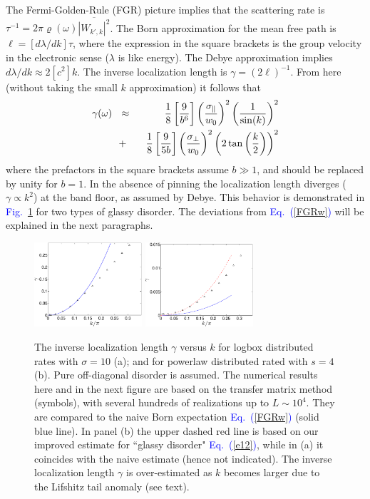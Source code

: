 \documentclass[onecolumn,fleqn,notitlepage,secnumarabic]{revtex4}
\newcommand{\Eq}[1]{\textcolor{blue}{Eq.\!\!~(\ref{#1})}}
\newcommand{\Fig}[1]{\textcolor{blue}{Fig.}\!\!~\ref{#1}}
\newcommand{\be}[1]{\begin{eqnarray}\ifthenelse{#1=-1}{\nonumber}{\ifthenelse{#1=0}{}{\label{e#1}}}}
\newcommand{\ee}{\end{eqnarray}}
\newcommand{\beq}{\be{1}}
\newcommand{\eeq}{\ee}
\begin{document}
The Fermi-Golden-Rule (FGR) picture implies that 
the scattering rate is ${\tau^{-1}= 2\pi \varrho(\omega) \overline{\left|W_{k',k}\right|^2}}$. 
%
The Born approximation for the mean free path is ${\ell=[d\lambda/dk]\tau}$, 
where the expression in the square brackets is the group velocity 
in the electronic sense ($\lambda$ is like energy). 
The Debye approximation implies $d\lambda/dk \approx 2[c^2]k$.
% 
The inverse localization length is $\gamma=(2\ell)^{-1}$. 
From here (without taking the small $k$ approximation) it follows that 
%
\beq \label{FGRv}
\gamma(\omega) \ \ &\approx& \ \ 
\frac{1}{8}\left[\frac{9}{b^6}\right]\left(\frac{\sigma_{\parallel}}{w_0}\right)^2  \left(\frac{1}{\sin(k)}\right)^2
\\ \label{FGRw} &+& \ \ 
\frac{1}{8}\left[\frac{9}{5b}\right]\left(\frac{\sigma_{\perp}}{w_0}\right)^2  \left( 2\tan\left(\frac{k}{2}\right) \right)^2
\eeq
%
where the prefactors in the square brackets assume ${b\gg1}$, and should be replaced by unity for ${b=1}$.
In the absence of pinning the localization length diverges ($\gamma \propto k^2$) 
at the band floor, as assumed by Debye. This behavior is demonstrated in \Fig{f2} 
for two types of glassy disorder. The deviations from \Eq{FGRw} 
will be explained in the next paragraphs. 




\begin{figure}

\includegraphics[width=4cm]{gammaVSkBX}
\includegraphics[width=4cm]{gammaVSkPL}

\caption{The inverse localization length $\gamma$ versus $k$ 
for logbox distributed rates with $\sigma=10$ (a);   
and for powerlaw distributed rated with $s=4$ (b).  
Pure off-diagonal disorder is assumed.
The numerical results here and in the next figure 
are based on the transfer matrix method (symbols), 
with several hundreds of realizations up to ${L\sim10^4}$.
They are compared to the naive Born expectation \Eq{FGRw} (solid blue line).
In panel (b) the upper dashed red line is based on our improved 
estimate for ``glassy disorder"  \Eq{e12}, 
while in (a) it coincides with the naive estimate (hence not indicated). 
The inverse localization length $\gamma$ is over-estimated 
as $k$ becomes larger due to the Lifshitz tail anomaly (see text).  
}
\label{f2}
\end{figure}
\end{document}
